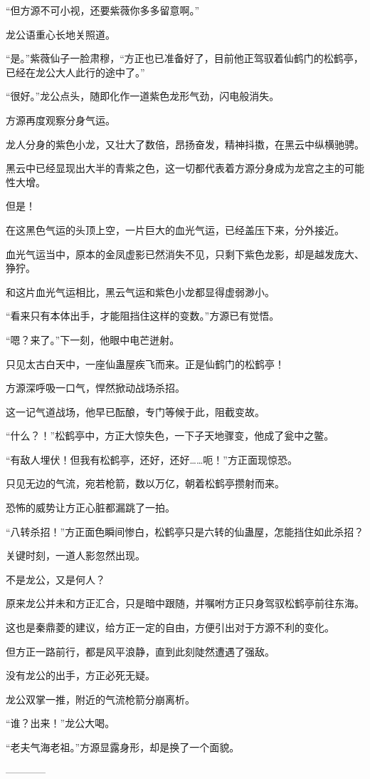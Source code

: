 \begin{this_body}
“但方源不可小视，还要紫薇你多多留意啊。”

龙公语重心长地关照道。

“是。”紫薇仙子一脸肃穆，“方正也已准备好了，目前他正驾驭着仙鹤门的松鹤亭，已经在龙公大人此行的途中了。”

“很好。”龙公点头，随即化作一道紫色龙形气劲，闪电般消失。

方源再度观察分身气运。

龙人分身的紫色小龙，又壮大了数倍，昂扬奋发，精神抖擞，在黑云中纵横驰骋。

黑云中已经显现出大半的青紫之色，这一切都代表着方源分身成为龙宫之主的可能性大增。

但是！

在这黑色气运的头顶上空，一片巨大的血光气运，已经盖压下来，分外接近。

血光气运当中，原本的金凤虚影已然消失不见，只剩下紫色龙影，却是越发庞大、狰狞。

和这片血光气运相比，黑云气运和紫色小龙都显得虚弱渺小。

“看来只有本体出手，才能阻挡住这样的变数。”方源已有觉悟。

“嗯？来了。”下一刻，他眼中电芒迸射。

只见太古白天中，一座仙蛊屋疾飞而来。正是仙鹤门的松鹤亭！

方源深呼吸一口气，悍然掀动战场杀招。

这一记气道战场，他早已酝酿，专门等候于此，阻截变故。

“什么？！”松鹤亭中，方正大惊失色，一下子天地骤变，他成了瓮中之鳖。

“有敌人埋伏！但我有松鹤亭，还好，还好……呃！”方正面现惊恐。

只见无边的气流，宛若枪箭，数以万亿，朝着松鹤亭攒射而来。

恐怖的威势让方正心脏都漏跳了一拍。

“八转杀招！”方正面色瞬间惨白，松鹤亭只是六转的仙蛊屋，怎能挡住如此杀招？

关键时刻，一道人影忽然出现。

不是龙公，又是何人？

原来龙公并未和方正汇合，只是暗中跟随，并嘱咐方正只身驾驭松鹤亭前往东海。

这也是秦鼎菱的建议，给方正一定的自由，方便引出对于方源不利的变化。

但方正一路前行，都是风平浪静，直到此刻陡然遭遇了强敌。

没有龙公的出手，方正必死无疑。

龙公双掌一推，附近的气流枪箭分崩离析。

“谁？出来！”龙公大喝。

“老夫气海老祖。”方源显露身形，却是换了一个面貌。

------------

\end{this_body}

